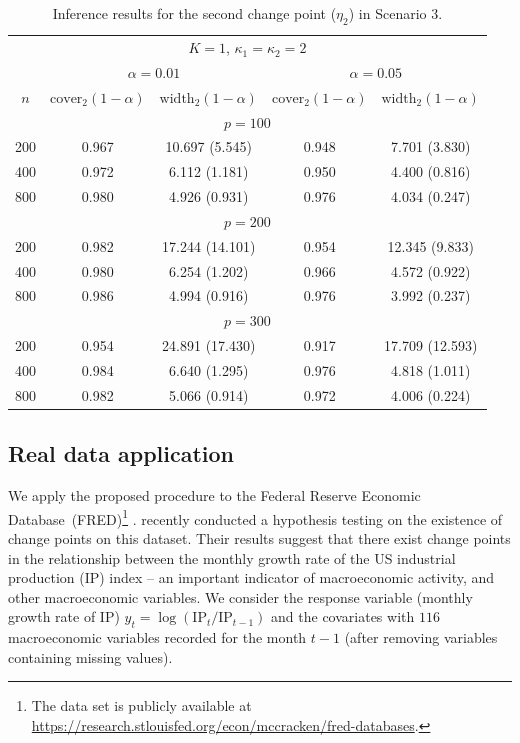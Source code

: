 \documentclass[11pt]{article}
\theoremstyle{plain}
\theoremstyle{definition}
\begin{document}
\begin{table}[htbp]
\centering
\caption{Inference results for the second change point ($\eta_2$) in Scenario 3. }
\begin{tabular}{ccccc}
\hline
\multicolumn{5}{c}{$K = 1$, $\kappa_1 = \kappa_2 = 2$} \\
 & \multicolumn{2}{c}{$\alpha = 0.01$} & \multicolumn{2}{c}{$\alpha = 0.05$} \\
$n$   & $\mathrm{cover}_2(1-\alpha)$ & $\mathrm{width}_2(1-\alpha)$ & $\mathrm{cover}_2(1-\alpha)$ & $\mathrm{width}_2(1-\alpha)$ \\ \hline
\multicolumn{5}{c}{$p = 100$}                                                                             \\
200 & 0.967            & 10.697 (5.545)  & 0.948            & 7.701 (3.830) \\
400 & 0.972            & 6.112 (1.181)  & 0.950    & 4.400 (0.816)  \\
800 & 0.980            & 4.926 (0.931)  & 0.976    & 4.034 (0.247) \\
\multicolumn{5}{c}{$p = 200$}                                                                             \\
200 & 0.982            & 17.244 (14.101) &    0.954 & 12.345 (9.833) \\
400 & 0.980            & 6.254 (1.202)  & 0.966  & 4.572 (0.922)  \\
800 & 0.986            & 4.994 (0.916)  & 0.976  & 3.992 (0.237)  \\
\multicolumn{5}{c}{$p = 300$}                                                                             \\
200 & 0.954            & 24.891 (17.430)   & 0.917    & 17.709 (12.593) \\
400 & 0.984            & 6.640 (1.295)  & 0.976    & 4.818 (1.011) \\
800 & 0.982            & 5.066 (0.914)  & 0.972   & 4.006 (0.224) \\ \hline
\end{tabular}
\label{tab:sce3_3}
\end{table}

\subsection{Real data application}\label{sec:realdata}
We apply the proposed procedure to the Federal Reserve Economic Database~(FRED)\footnote{The data set is publicly available at \url{https://research.stlouisfed.org/econ/mccracken/fred-databases}.} \citep{mccracken2016fred}. \cite{wang2022optimal} recently conducted a hypothesis testing on the existence of change points on this dataset. Their results suggest that there exist change points in the relationship between the monthly growth rate of the US industrial production (IP) index -- an important indicator of macroeconomic activity, and other macroeconomic variables. We consider the response variable (monthly growth rate of IP) $y_t = \log(\mathrm{IP}_t / \mathrm{IP}_{t-1})$ and the covariates with $116$ macroeconomic variables recorded for the month $t-1$ (after removing variables containing missing values).
\end{document}
